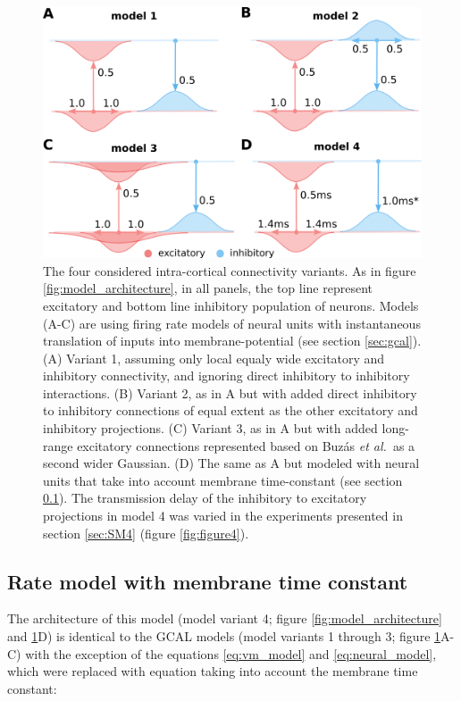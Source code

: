 \documentclass[utf8]{frontiersSCNS}
\newcommand{\etal}{\textit{et al.}}
\begin{document}
\begin{figure}[htpb!] 
\centering
\includegraphics[width=16cm]{./SVG/FigureModelVariants/drawing.png}
\caption{The four considered intra-cortical connectivity variants. As in figure \ref{fig:model_architecture}, in all panels, the top line represent excitatory and bottom line inhibitory population of neurons. Models (A-C) are using firing rate models of neural units with instantaneous 
translation of inputs into membrane-potential (see section \ref{sec:gcal}). 
(A) Variant 1, assuming only local equaly wide excitatory and inhibitory connectivity, and ignoring direct inhibitory to inhibitory interactions. (B) Variant 2, as in A but with added direct inhibitory to inhibitory connections of equal extent as the other excitatory and inhibitory projections. (C) Variant 3, as in A but with added long-range excitatory connections represented based on Buz\'as \etal\,\citep{Buzas2006} as a second wider Gaussian. (D) The same as A but modeled with neural units that take into account membrane time-constant (see section \ref{sec:rate}).
The transmission delay of the inhibitory to excitatory projections in model 4 was varied in the experiments presented in section \ref{sec:SM4}
(figure \ref{fig:figure4}).}
\label{fig:model_variants}
\end{figure} 


\subsection{Rate model with membrane time constant} \label{sec:rate}

The architecture of this model (model variant 4; figure \ref{fig:model_architecture} and \ref{fig:model_variants}D) is identical to the GCAL models 
(model variants 1 through 3; figure \ref{fig:model_variants}A-C) with the exception of the equations \ref{eq:vm_model} and \ref{eq:neural_model}, which were replaced with equation taking into account the membrane time constant: 
\end{document}
